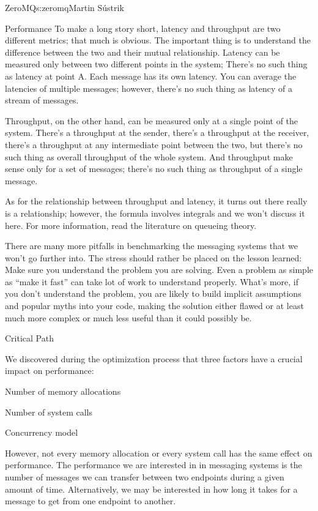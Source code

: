 \begin{aosachapter}{ZeroMQ}{s:zeromq}{Martin S\'{u}strik}
\begin{aosasect1}{Performance}
To make a long story short, latency and throughput are two different
metrics; that much is obvious. The important thing is to understand
the difference between the two and their mutual relationship. Latency
can be measured only between two different points in the
system; There's no such thing as latency at point A. Each message has
its own latency. You can average the latencies of multiple messages;
however, there's no such thing as latency of a stream of
messages. 

Throughput, on the other hand, can be measured only at a
single point of the system. There's a throughput at the sender,
there's a throughput at the receiver, there's a throughput at any
intermediate point between the two, but there's no such thing as
overall throughput of the whole system. And throughput make sense only for
a set of messages; there's no such thing as throughput of a single
message.

As for the relationship between throughput and latency, it turns out
there really is a relationship; however, the formula involves
integrals and we won't discuss it here. For more information, read the
literature on queueing
theory.

There are many more pitfalls in benchmarking the messaging systems
that we won't go further into. The stress should rather be placed on
the lesson learned: Make sure you understand the problem you are
solving. Even a problem as simple as ``make it fast'' can take lot of
work to understand properly. What's more, if you don't understand the
problem, you are likely to build implicit assumptions and popular
myths into your code, making the solution either flawed or at least
much more complex or much less useful than it could possibly be.

\end{aosasect1}

\begin{aosasect1}{Critical Path}

We discovered during the optimization process that three factors have a crucial
impact on performance:

\begin{aosaitemize}
\item Number of memory allocations
\item Number of system calls
\item Concurrency model
\end{aosaitemize}

However, not every memory
allocation or every system call has the same effect on 
performance.  
The performance we are interested in in messaging systems is the number of
messages we can transfer between two endpoints during a given amount
of time. Alternatively, we may be interested in how long it takes for
a message to get from one endpoint to another.


\end{aosasect1}
\end{aosachapter}
